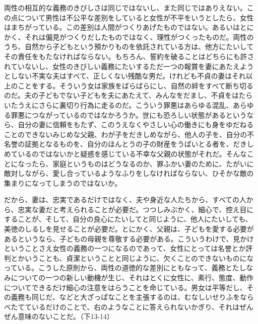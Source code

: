 両性の相互的な義務のきびしさは同じではないし、また同じではありえない。この点について男性は不公平な差別をしていると女性が不平をいうとしたら、女性はまちがっている。この差別は人間がつくりあげたものではない。あるいはとにかく、それは偏見がつくりだしたものではなく、理性がつくったものだ。両性のうち、自然から子どもという預かりものを依託されている方は、他方にたいしてその責任をもたなければならない。もちろん、誓約を破ることはどちらにも許されていないし、女性のきびしい義務にたいするただ一つの報賞を妻にあたえようとしない不実な夫はすべて、正しくない残酷な男だ。けれども不貞の妻はそれ以上のことをする。そういう女は家族をばらばらにし、自然の絆をすべて断ち切るのだ。夫の子どもでない子どもを夫にあたえて、みんなをだまし、不貞をはたらいたうえにさらに裏切り行為に走るのだ。こういう罪悪はあらゆる混乱、あらゆる罪悪につながっているのではなかろうか。世にも恐ろしい状態があるというなら、自分の妻に信頼をもたず、このうえなくやさしい心の働きにも身をゆだねることのできないみじめな父親、わが子をだきしめながら、他人の子を、自分の不名誉の証拠となるものを、自分のほんとうの子の財産をうばいとる者を、だきしめているのではないかと疑惑を感じている不幸な父親の状態がそれだ。そんなことになったら、家庭というものはどうなるのか、罪ふかい妻のために、たがいに敵対しながら、愛し合っているようなふりをしなければならない、ひそかな敵の集まりになってしまうのではないか。

だから、妻は、忠実であるだけではなく、夫や身近な人たちから、すべての人から、忠実な妻だと考えられることが必要だ。つつしみぶかく、細心で、控え目にすることが、そして、自分の良心にたいしてと同じように、他人にたいしても、美徳のしるしを見せることが必要だ。とにかく、父親は、子どもを愛する必要があるというなら、子どもの母親を尊敬する必要がある。こういうわけで、見かけということさえ女性の義務の一つになるのであって、女性にとっては名誉とか評判とかいうことも、貞潔ということと同じように、欠くことのできないものになっている。こうした原則から、両性の道徳的な差別にともなって、義務とたしなみについての一つの新しい動機が生じ、それはとくに女性に、素行、態度、動作についてできるだけ細心の注意をはらうことを命じている。男女は平等だし、その義務も同じだ、などと大ざっぱなことを主張するのは、むなしいせりふをならべたてているだけのことで、右のようなことに答えられないかぎり、それはぜんぜん意味のないことだ。（下13-14）

\subsection{}


